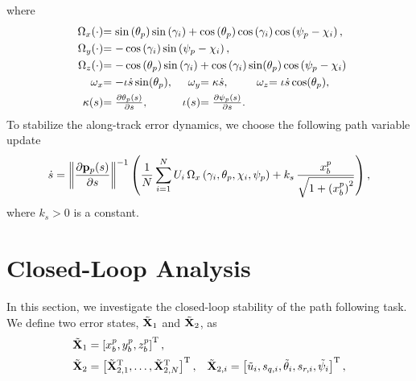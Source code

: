 where
\begin{subequations}
    \begin{align}
        \scale[1]{\Omega_x(\cdot)} & \mathrlap{\scale[1]{= \sin\left(\theta_p\right)\sin\left(\gamma_i\right) + \cos\left(\theta_p\right)\cos\left(\gamma_i\right)\cos\left(\psi_p-\chi_i\right),}} \\
        \scale[1]{\Omega_y(\cdot)} & \mathrlap{\scale[1]{= -\cos\left(\gamma_i\right)\sin\left(\psi_p - \chi_i\right),}} \\
        \scale[1]{\Omega_z(\cdot)} & \mathrlap{\scale[1]{=-\cos\left(\theta_p\right)\sin\left(\gamma_i\right) + \cos\left(\gamma_i\right)\sin(\theta_p)\cos\left(\psi_p-\chi_i\right)}} \\
        \scale[1]{\omega_x} & \scale[1]{= -\iota\dot{s}\sin(\theta_p),} &
        \scale[1]{\omega_y} & \scale[1]{= \kappa\dot{s},} &
        \scale[1]{\omega_z} & \scale[1]{= \iota\dot{s}\cos(\theta_p),} \\
        \scale[1]{\kappa(s)} & \scale[1]{= \frac{\partial \theta_p(s)}{\partial s},} &
        \scale[1]{\iota(s)} & \scale[1]{= \frac{\partial \psi_p(s)}{\partial s}.}
    \end{align}
\end{subequations}
To stabilize the along-track error dynamics, we choose the following path variable update 
\begin{equation}
    \dot{s} = \left\|\frac{\partial \mathbf{p}_p(s)}{\partial s}\right\|^{-1} \left( \frac{1}{N}\sum_{i=1}^N U_i\,\Omega_x\left(\gamma_i, \theta_p, \chi_i, \psi_p\right) + k_{s}\,\frac{x_b^p}{\sqrt{1+\left(x_b^p\right)^2}}\right),
    \label{eq:nsb_5dof_path_update}
\end{equation}
where $k_{s} > 0$ is a constant.

\section{Closed-Loop Analysis}
\label{sec:nsb_5dof_path_stability}
In this section, we investigate the closed-loop stability of the path following task.
We define two error states, $\tilde{\mathbf{X}}_1$ and $\tilde{\mathbf{X}}_2$, as
\begin{align}
    \tilde{\mathbf{X}}_1 &= \left[x_b^p, y_b^p, z_b^p\right]^{\mathrm{T}}, && \\
    \tilde{\mathbf{X}}_2 &= \left[\tilde{\mathbf{X}}_{2,1}^{\mathrm{T}}, \ldots, \tilde{\mathbf{X}}_{2,N}^{\mathrm{T}}\right]^{\mathrm{T}}, &
    \tilde{\mathbf{X}}_{2,i} &= \left[\tilde{u}_i, s_{q,i}, \tilde{\theta}_i, s_{r,i}, \tilde{\psi}_i\right]^{\mathrm{T}},
\end{align}

